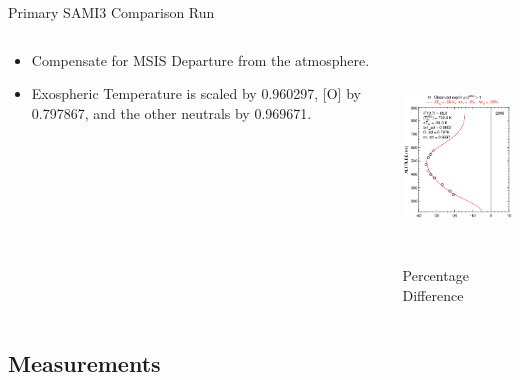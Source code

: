 \documentclass{beamer}
\begin{document}
\begin{frame}
  {Primary SAMI3 Comparison Run}
  \begin{columns}
    \begin{column}{.5\textwidth}
      \begin{itemize}
	\item      Compensate for MSIS Departure from the atmosphere.
	\item      Exospheric Temperature is scaled by 0.960297, [O] by 0.797867, and the other neutrals by 0.969671.
      \end{itemize}
    \end{column}
      \begin{column}{.5\textwidth}
	\includegraphics[height=2.2in]{cropped}\\
	Percentage Difference 
      \end{column}
  \end{columns}
\end{frame}

\subsection{Measurements}
\end{document}
